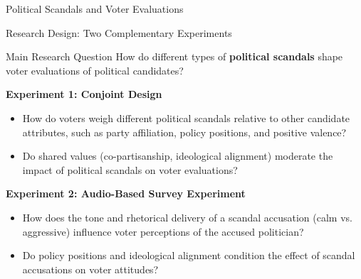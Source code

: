 \documentclass[9pt, aspectratio=169]{beamer}
\newcommand{\customcite}[1]{\textcolor{blue}{\footnotesize\parencite{#1}}}
\begin{document}
\begin{section} {Political Scandals and Voter Evaluations}

\begin{frame}{Research Design: Two Complementary Experiments}

\begin{block}{Main Research Question}  
\centering How do different types of \textbf{political scandals} shape voter evaluations of political candidates? 
\end{block}
\vspace{0.3cm}

\textbf{Experiment 1: Conjoint Design} \customcite{hainmueller2014}  
\begin{itemize}
    \item How do voters weigh different political scandals relative to other candidate attributes, such as party affiliation, policy positions, and positive valence?
    \item Do shared values (co-partisanship, ideological alignment) moderate the impact of political scandals on voter evaluations?
\end{itemize}
\vspace{0.2cm}
\textbf{Experiment 2: Audio-Based Survey Experiment}  
\begin{itemize}
    \item How does the tone and rhetorical delivery of a scandal accusation (calm vs. aggressive) influence voter perceptions of the accused politician?
    \item Do policy positions and ideological alignment condition the effect of scandal accusations on voter attitudes?
\end{itemize} 
\end{frame}


\end{section}
\end{document}
